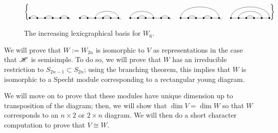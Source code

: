\documentclass{amsart}
\begin{document}
\begin{figure}
  \def\cbasisspacing{5mm}
  $\cbr{
    \begin{gathered}
      \Matching{6}{1/2, 3/4, 5/6}, \hspace{\cbasisspacing}
      \Matching{6}{1/2, 3/6, 4/5}, \hspace{\cbasisspacing}
      \Matching{6}{1/4, 2/3, 5/6}, \hspace{\cbasisspacing}
      \Matching{6}{1/6, 2/3, 4/5}, \hspace{\cbasisspacing}
      \Matching{6}{1/6, 2/5, 3/4}
    \end{gathered}}$
    \caption{The increasing lexicgraphical basis for $W_{6}$.}
  \label{S6 Basis}
\end{figure}

We will prove that $W := W_{2n}$ is isomorphic to $V$ as representations in the case that $\mathscr{H}$ is semisimple.
To do so, we will prove that $W$ has an irreducible restriction to $S_{2n-1} \subset S_{2n}$;
using the branching theorem, this implies that $W$ is isomorphic to a Specht module corresponding to a rectangular young diagram.

We will move on to prove that these modules have unique dimension up to transposition of the diagram;
then, we will show that $\dim V = \dim W$ so that $W$ corresponds to an $n \times 2$ or $2 \times n$ diagram.
We will then do a short character computation to prove that $V \cong W$.

\newpage
\end{document}
